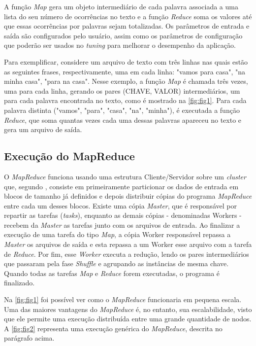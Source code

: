 \newpage
A função \textit{Map} gera um objeto intermediário de cada palavra associada a uma lista do seu número de ocorrências no texto e a função \textit{Reduce} soma os valores até que essas ocorrências por palavras sejam totalizadas. Os parâmetros de entrada e saída são configurados pelo usuário, assim como os parâmetros de configuração que poderão ser usados no \textit{\gls{tuning}} para melhorar o desempenho da aplicação.

Para exemplificar, considere um arquivo de texto com três linhas nas quais estão as seguintes frases, respectivamente, uma em cada linha: "vamos para casa", "na minha casa", "para na casa". Nesse exemplo, a função \textit{Map} é chamada três vezes, uma para cada linha, gerando os pares (CHAVE, VALOR) intermediários, um para cada palavra encontrada no texto, como é mostrado na \autoref{fig:fig1}. Para cada palavra distinta ("vamos", "para", "casa", "na", "minha"), é executada a função \textit{Reduce}, que soma quantas vezes cada uma dessas palavras apareceu no texto e gera um arquivo de saída.


\subsection{Execução do MapReduce}\label{ssec:execucaomapreduce}

O \textit{MapReduce} funciona usando uma estrutura Cliente/Servidor sobre um \textit{cluster} que, segundo \textcite{MapReduce08}, consiste em primeiramente particionar os dados de entrada em blocos de tamanho já definidos e depois distribuir cópias do programa \textit{MapReduce} entre cada um desses blocos. Existe uma cópia \textit{Master}, que é responsável por repartir as tarefas (\textit{tasks}), enquanto as demais cópias - denominadas Workers - recebem da \textit{Master} as tarefas junto com os arquivos de entrada. Ao finalizar a execução de uma tarefa do tipo \textit{Map}, a cópia Worker responsável repassa a \textit{Master} os arquivos de saída e esta repassa a um Worker esse arquivo com a tarefa de \textit{Reduce}. Por fim, esse \textit{Worker} executa a redução, lendo os pares intermediários que passaram pela fase \textit{Shuffle} e agrupando as instâncias de mesma chave. Quando todas as tarefas \textit{Map} e \textit{Reduce} forem executadas, o programa é finalizado.

Na \autoref{fig:fig1} foi possível ver como o \textit{MapReduce} funcionaria em pequena escala. Uma das maiores vantagens do \textit{MapReduce} é, no entanto, sua escalabilidade, visto que ele permite uma execução distribuída entre uma grande quantidade de nodos. A \autoref{fig:fig2}  representa uma execução genérica do \textit{MapReduce}, descrita no parágrafo acima.

